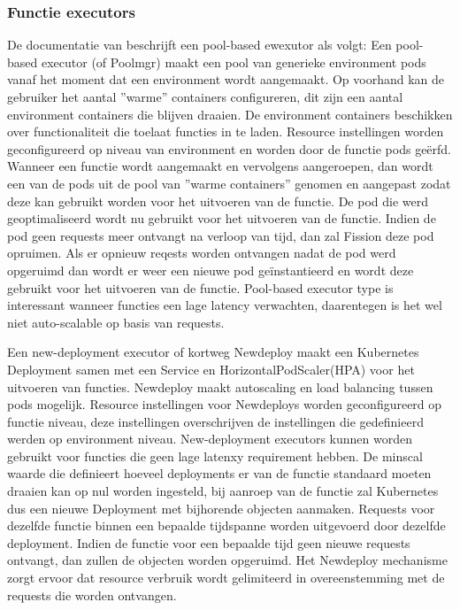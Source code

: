 \subsubsection{Functie executors}
\label{sec:fission-executors}
\begin{description}[style=unboxed, labelwidth=\linewidth, listparindent =0pt]
    \item[Pool-based executor]
    De documentatie van \textcite{Fission2019} beschrijft een pool-based ewexutor als volgt:
    Een pool-based executor (of Poolmgr) maakt een pool van generieke environment pods vanaf het moment dat een environment wordt aangemaakt. Op voorhand kan de gebruiker het aantal ''warme'' containers configureren, dit zijn een aantal environment containers die blijven draaien. De environment containers beschikken over functionaliteit die toelaat functies in te laden. Resource instellingen worden geconfigureerd op niveau van environment en worden door de functie pods geërfd. Wanneer een functie wordt aangemaakt en vervolgens aangeroepen, dan wordt een van de pods uit de pool van ''warme containers'' genomen en aangepast zodat deze kan gebruikt worden voor het uitvoeren van de functie. De pod die werd geoptimaliseerd wordt nu gebruikt voor het uitvoeren van de functie. Indien de pod geen requests meer ontvangt na verloop van tijd, dan zal Fission deze pod opruimen. Als er opnieuw reqests worden ontvangen nadat de pod werd opgeruimd dan wordt er weer een nieuwe pod geïnstantieerd en wordt deze gebruikt voor het uitvoeren van de functie. Pool-based executor type is interessant wanneer functies een lage latency verwachten, daarentegen is het wel niet auto-scalable op basis van requests.
    \newline
    
    \item[New-deployment executor]
    Een new-deployment executor of kortweg Newdeploy maakt een Kubernetes Deployment samen met een Service en HorizontalPodScaler(HPA) voor het uitvoeren van functies. Newdeploy maakt autoscaling en load balancing tussen pods mogelijk. Resource instellingen voor Newdeploys worden geconfigureerd op functie niveau, deze instellingen overschrijven de instellingen die gedefinieerd werden op environment niveau. New-deployment executors kunnen worden gebruikt voor functies die geen lage latenxy requirement hebben. De minscal waarde die definieert hoeveel deployments er van de functie standaard moeten draaien kan op nul worden ingesteld, bij aanroep van de functie zal Kubernetes dus een nieuwe Deployment met bijhorende objecten aanmaken. Requests voor dezelfde functie binnen een bepaalde tijdspanne worden uitgevoerd door dezelfde deployment. Indien de functie voor een bepaalde tijd geen nieuwe requests ontvangt, dan zullen de objecten worden opgeruimd. Het Newdeploy mechanisme zorgt ervoor dat resource verbruik wordt gelimiteerd in overeenstemming met de requests die worden ontvangen.
    

\end{description}
